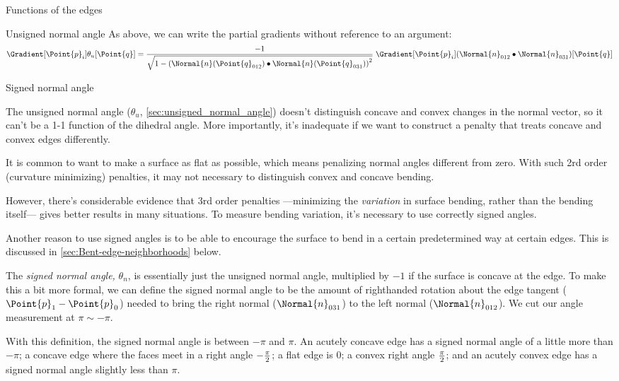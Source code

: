 \begin{plSection}{Functions of the edges}
\begin{plSection}{Unsigned normal angle}
As above, we can write the partial gradients without reference to an argument:
\begin{equation}
\Gradient[\Point{p}_i]{\theta_u}[\Point{q}]
=
{ -1 \over \sqrt{1 - \left( \Normal{n}(\Point{q}_{012}) \bullet \Normal{n}(\Point{q}_{031}) \right)^2} }
\; \Gradient[\Point{p}_i]{\left(\Normal{n}_{012}\bullet\Normal{n}_{031}\right)}[\Point{q}]
\end{equation}

\end{plSection}%

\begin{plSection}{Signed normal angle}
\label{sec:signed_normal_angle}

The unsigned normal angle
($\theta_u$, \cref{sec:unsigned_normal_angle})
doesn't distinguish concave and convex changes in the normal vector,
so it can't be a 1-1 function of the dihedral angle.
More importantly, it's inadequate if we want to construct
a penalty that treats concave and convex edges differently.

It is common to want to make a surface as flat as possible,
which means penalizing normal angles different from zero.
With such 2rd order (curvature minimizing) penalties, 
it may not necessary to distinguish
convex and concave bending.

However, there's considerable evidence that
$3$rd order penalties ---minimizing the {\it variation}
in surface bending, rather than the bending itself---
gives better results in many situations.
To measure bending variation, it's necessary
to use correctly signed angles.

Another reason to use signed angles is to be able
to encourage the surface to bend in a certain
predetermined way at certain edges.
This is discussed in \cref{sec:Bent-edge-neighborhoods}
below.

The {\it signed normal angle,} $\theta_n$,
is essentially just the
unsigned normal angle, multiplied by $-1$ if the surface is
concave at the edge.
To make this a bit more formal,
we can define the signed normal angle to be the amount
of righthanded rotation about the edge tangent ($\Point{p}_1 - \Point{p}_0$)
needed to bring the right normal ($\Normal{n}_{031}$) to
the left normal ($\Normal{n}_{012}$).
We cut our angle measurement at $\pi \sim -\pi$.

With this definition, the signed normal angle
is between $-\pi$ and $\pi$.
An acutely concave edge has a signed normal angle
of a little more than $-\pi$;
a concave edge where the faces meet in a right angle
$-{\pi \over 2}$;
a flat edge is $0$;
a convex right angle $\pi \over 2$;
and an acutely convex edge has a signed normal angle
slightly less than $\pi$.


\end{plSection}
\end{plSection}
